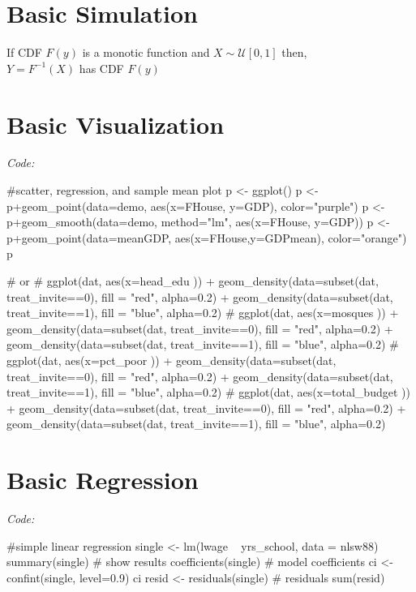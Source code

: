 \section{Basic Simulation}
If CDF $F(y)$ is a monotic function and $X \sim \mathcal{U}[0, 1]$ then,\\
$Y = F^{-1}(X)$ has CDF $F(y)$
\section{Basic Visualization}
\textit{Code: }
\begin{spverbatim}
#scatter, regression, and sample mean plot
p <- ggplot()
p <- p+geom_point(data=demo, aes(x=FHouse, y=GDP), color="purple")
p <- p+geom_smooth(data=demo, method="lm", aes(x=FHouse, y=GDP))
p <- p+geom_point(data=meanGDP, aes(x=FHouse,y=GDPmean), color="orange")
p

# or
# ggplot(dat, aes(x=head_edu )) + geom_density(data=subset(dat, treat_invite==0), fill = "red", alpha=0.2) + geom_density(data=subset(dat, treat_invite==1), fill = "blue", alpha=0.2)
# ggplot(dat, aes(x=mosques )) + geom_density(data=subset(dat, treat_invite==0), fill = "red", alpha=0.2) + geom_density(data=subset(dat, treat_invite==1), fill = "blue", alpha=0.2)
# ggplot(dat, aes(x=pct_poor )) + geom_density(data=subset(dat, treat_invite==0), fill = "red", alpha=0.2) + geom_density(data=subset(dat, treat_invite==1), fill = "blue", alpha=0.2)
# ggplot(dat, aes(x=total_budget )) + geom_density(data=subset(dat, treat_invite==0), fill = "red", alpha=0.2) + geom_density(data=subset(dat, treat_invite==1), fill = "blue", alpha=0.2)
\end{spverbatim}
\section{Basic Regression}
\textit{Code: }
\begin{spverbatim}
#simple linear regression
single <- lm(lwage ~ yrs_school, data = nlsw88)
summary(single) # show results
coefficients(single) # model coefficients
ci <- confint(single, level=0.9) 
ci
resid <- residuals(single) # residuals
sum(resid)
\end{spverbatim}